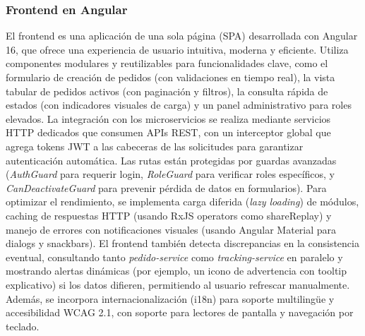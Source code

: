 \documentclass[a4paper,12pt]{article}
\begin{document}
\subsubsection{Frontend en Angular}
El frontend es una aplicación de una sola página (SPA) desarrollada con Angular 16, que ofrece una experiencia de usuario intuitiva, moderna y eficiente. Utiliza componentes modulares y reutilizables para funcionalidades clave, como el formulario de creación de pedidos (con validaciones en tiempo real), la vista tabular de pedidos activos (con paginación y filtros), la consulta rápida de estados (con indicadores visuales de carga) y un panel administrativo para roles elevados. La integración con los microservicios se realiza mediante servicios HTTP dedicados que consumen APIs REST, con un interceptor global que agrega tokens JWT a las cabeceras de las solicitudes para garantizar autenticación automática. Las rutas están protegidas por guardas avanzadas (\textit{AuthGuard} para requerir login, \textit{RoleGuard} para verificar roles específicos, y \textit{CanDeactivateGuard} para prevenir pérdida de datos en formularios). Para optimizar el rendimiento, se implementa carga diferida (\textit{lazy loading}) de módulos, caching de respuestas HTTP (usando RxJS operators como shareReplay) y manejo de errores con notificaciones visuales (usando Angular Material para dialogs y snackbars). El frontend también detecta discrepancias en la consistencia eventual, consultando tanto \textit{pedido-service} como \textit{tracking-service} en paralelo y mostrando alertas dinámicas (por ejemplo, un icono de advertencia con tooltip explicativo) si los datos difieren, permitiendo al usuario refrescar manualmente. Además, se incorpora internacionalización (i18n) para soporte multilingüe y accesibilidad WCAG 2.1, con soporte para lectores de pantalla y navegación por teclado.
\end{document}
